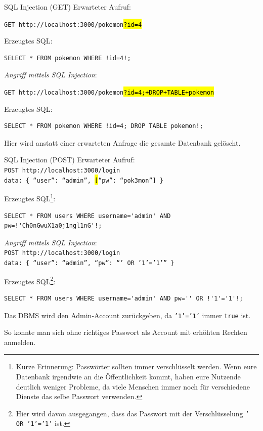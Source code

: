 \begin{example}{SQL Injection (GET)}
    Erwarteter Aufruf:

    \texttt{GET http://localhost:3000/pokemon\hl{?id=4}}

    Erzeugtes SQL:
    \begin{lstlisting}[language=mysql]
        SELECT * FROM pokemon WHERE !id=4!;
    \end{lstlisting}

    \emph{Angriff mittels SQL Injection}:

    \texttt{GET http://localhost:3000/pokemon\hl{?id=4;+DROP+TABLE+pokemon}}

    Erzeugtes SQL:
    \begin{lstlisting}[language=mysql]
        SELECT * FROM pokemon WHERE !id=4; DROP TABLE pokemon!;
    \end{lstlisting}

    Hier wird anstatt einer erwarteten Anfrage die gesamte Datenbank gelöscht.
\end{example}

\begin{example}{SQL Injection (POST)}
    Erwarteter Aufruf: \\
    \texttt{POST http://localhost:3000/login} \\
    \texttt{data: \{ \enquote{user}: \enquote{admin}, \hl[\enquote{pw}: \enquote{pok3mon}] \}}

    Erzeugtes SQL\footnote{
        Kurze Erinnerung: Passwörter sollten immer verschlüsselt werden.
        Wenn eure Datenbank irgendwie an die Öffentlichkeit kommt, haben eure Nutzende deutlich weniger Probleme, da viele Menschen immer noch für verschiedene Dienste das selbe Passwort verwenden.
    }:
    \begin{lstlisting}[language=mysql]
        SELECT * FROM users WHERE username='admin' AND pw=!'Ch0nGwuX1a0j1ngl1nG'!;
    \end{lstlisting}

    \emph{Angriff mittels SQL Injection}: \\
    \texttt{POST http://localhost:3000/login} \\
    \texttt{data: \{ \enquote{user}: \enquote{admin}, \enquote{pw}: \enquote{' OR '1'='1'} \}}

    Erzeugtes SQL\footnote{Hier wird davon ausgegangen, dass das Passwort mit der Verschlüsselung \texttt{' OR '1'='1'} ist.}:
    \begin{lstlisting}[language=mysql]
        SELECT * FROM users WHERE username='admin' AND pw='' OR !'1'='1'!;
    \end{lstlisting}

    Das DBMS wird den Admin-Account zurückgeben, da \texttt{'1'='1'} immer \texttt{true} ist.

    So konnte man sich ohne richtiges Passwort als Account mit erhöhten Rechten anmelden.
\end{example}

